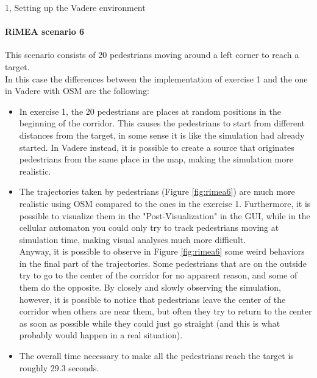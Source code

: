 \documentclass[10pt,a4paper]{article}
\begin{document}
\begin{task}{1, Setting up the Vadere environment}
\paragraph{RiMEA scenario 6}
This scenario consists of 20 pedestrians moving around a left corner to reach a target.\\
In this case the differences between the implementation of exercise 1 and the one in Vadere with OSM are the following:
\begin{itemize}
    \item In exercise 1, the 20 pedestrians are places at random positions in the beginning of the corridor.
    This causes the pedestrians to start from different distances from the target, in some sense it is like the simulation had already started.
    In Vadere instead, it is possible to create a source that originates pedestrians from the same place in the map, making the simulation more realistic.
    
    \item The trajectories taken by pedestrians (Figure \ref{fig:rimea6}) are much more realistic using OSM compared to the ones in the exercise 1.
    Furthermore, it is possible to visualize them in the "Post-Visualization" in the GUI, while in the cellular automaton you could only try to track pedestrians moving at simulation time, making visual analyses much more difficult.\\
    Anyway, it is possible to observe in Figure \ref{fig:rimea6} some weird behaviors in the final part of the trajectories.
    Some pedestrians that are on the outside try to go to the center of the corridor for no apparent reason, and some of them do the opposite.
    By closely and slowly observing the simulation, however, it is possible to notice that pedestrians leave the center of the corridor when others are near them, but often they try to return to the center as soon as possible while they could just go straight (and this is what probably would happen in a real situation).
    
    \item The overall time necessary to make all the pedestrians reach the target is roughly 29.3 seconds.
\end{itemize}


\end{task}
\end{document}
